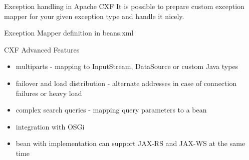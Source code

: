 	\begin{frame}{Exception handling in Apache CXF}
		It is possible to prepare custom exception mapper for your given exception type and handle it nicely.
		
		 
		
		Exception Mapper definition in beans.xml
		 
	\end{frame}
	
	\begin{frame}{CXF Advanced Features}
		\begin{itemize}
		  \item multiparts - mapping to InputStream, DataSource or custom Java types
		  \item failover and load distribution - alternate addresses in case of connection failures or heavy load
		  \item complex search queries - mapping query parameters to a bean
		  \item integration with OSGi
		  \item bean with implementation can support JAX-RS and JAX-WS at the same time			
		\end{itemize}
	\end{frame}
